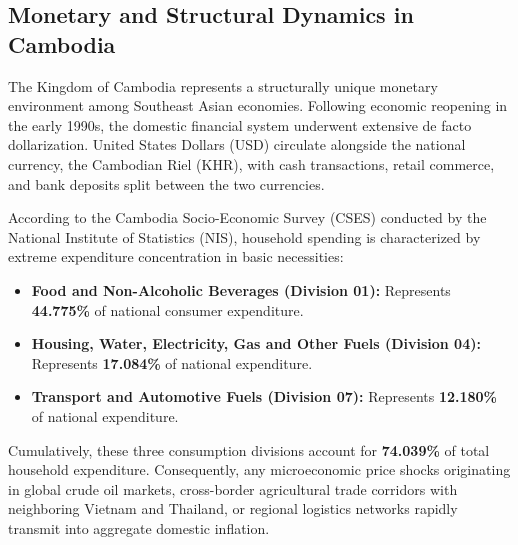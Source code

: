 \documentclass[11pt,a4paper]{article}
\begin{document}
\subsection{Monetary and Structural Dynamics in Cambodia}
The Kingdom of Cambodia represents a structurally unique monetary environment among Southeast Asian economies. Following economic reopening in the early 1990s, the domestic financial system underwent extensive de facto dollarization. United States Dollars (USD) circulate alongside the national currency, the Cambodian Riel (KHR), with cash transactions, retail commerce, and bank deposits split between the two currencies. 

According to the Cambodia Socio-Economic Survey (CSES) conducted by the National Institute of Statistics (NIS), household spending is characterized by extreme expenditure concentration in basic necessities:
\begin{itemize}[noitemsep]
    \item \textbf{Food and Non-Alcoholic Beverages (Division 01):} Represents \textbf{44.775\%} of national consumer expenditure.
    \item \textbf{Housing, Water, Electricity, Gas and Other Fuels (Division 04):} Represents \textbf{17.084\%} of national expenditure.
    \item \textbf{Transport and Automotive Fuels (Division 07):} Represents \textbf{12.180\%} of national expenditure.
\end{itemize}
Cumulatively, these three consumption divisions account for \textbf{74.039\%} of total household expenditure. Consequently, any microeconomic price shocks originating in global crude oil markets, cross-border agricultural trade corridors with neighboring Vietnam and Thailand, or regional logistics networks rapidly transmit into aggregate domestic inflation.
\end{document}
